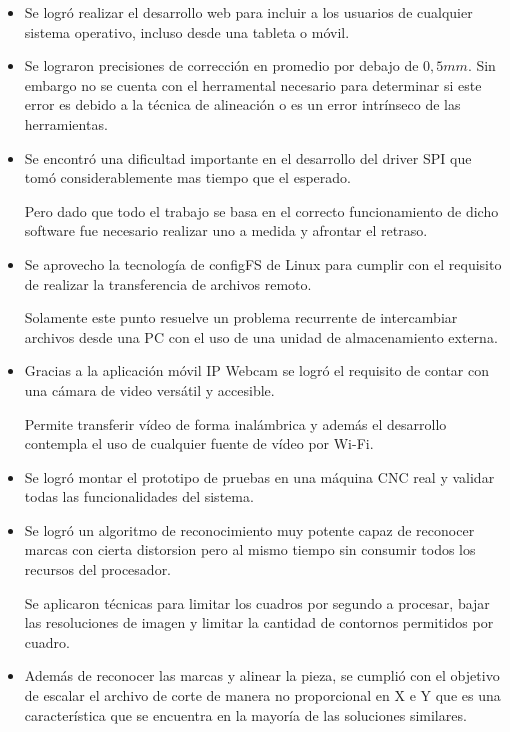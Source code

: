 \begin{itemize}
   \item{Se logró realizar el desarrollo web para incluir a los usuarios de cualquier sistema operativo, incluso desde una tableta o móvil.}

   \item{Se lograron precisiones de corrección en promedio por debajo de $0,5mm$. Sin embargo no se cuenta con el herramental necesario para determinar si este error es debido a la técnica de alineación o es un error intrínseco de las herramientas.}

   \item{Se encontró una dificultad importante en el desarrollo del driver SPI que tomó considerablemente mas tiempo que el esperado. \par
      Pero dado que todo el trabajo se basa en el correcto funcionamiento de dicho software fue necesario realizar uno a medida y afrontar el retraso.}

   \item{Se aprovecho la tecnología de configFS de Linux para cumplir con el requisito de realizar la transferencia de archivos remoto.\par
      Solamente este punto resuelve un problema recurrente de intercambiar archivos desde una PC con el uso de una unidad de almacenamiento externa.}
   \item{Gracias a la aplicación móvil IP Webcam se logró el requisito de contar con una cámara de video versátil y accesible.\par
      Permite transferir vídeo de forma inalámbrica y además el desarrollo contempla el uso de cualquier fuente de vídeo por Wi-Fi.}

   \item{Se logró montar el prototipo de pruebas en una máquina CNC real y validar todas las funcionalidades del sistema.}

   \item{Se logró un algoritmo de reconocimiento muy potente capaz de reconocer marcas con cierta distorsion pero al mismo tiempo sin consumir todos los recursos del procesador. \par
      Se aplicaron técnicas para limitar los cuadros por segundo a procesar, bajar las resoluciones de imagen y limitar la cantidad de contornos permitidos por cuadro.}

   \item{Además de reconocer las marcas y alinear la pieza, se cumplió con el objetivo de escalar el archivo de corte de manera no proporcional en X e Y que es una característica que se encuentra en la mayoría de las soluciones similares.}


\end{itemize}
